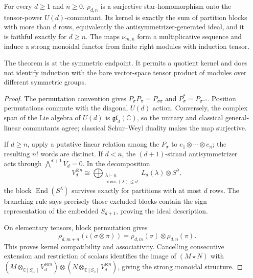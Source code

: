 \begin{theorem}
{\normalfont\statusProved}\quad For every $d\geq1$ and $n\geq0$,
$\rho_{d,n}$ is a surjective star-homomorphism onto the tensor-power
$U(d)$-commutant.  Its kernel is exactly the sum of partition blocks with
more than $d$ rows, equivalently the antisymmetrizer-generated ideal, and it
is faithful exactly for $d\geq n$.  The maps $\nu_{m,n}$ form a
multiplicative sequence and induce a strong monoidal functor from finite
right modules with induction tensor.
\end{theorem}
\begin{scope}
The theorem is at the symmetric endpoint.  It permits a quotient kernel and
does not identify induction with the bare vector-space tensor product of
modules over different symmetric groups.
\end{scope}
\begin{proof}
The permutation convention gives $P_\sigma P_\pi=P_{\sigma\pi}$ and
$P_\sigma^*=P_{\sigma^{-1}}$.  Position permutations commute with the
diagonal $U(d)$ action.  Conversely, the complex span of the Lie algebra of
$U(d)$ is $\mathfrak{gl}_d(\mathbb C)$, so the unitary and classical
general-linear commutants agree; classical Schur--Weyl duality makes the map
surjective.

If $d\geq n$, apply a putative linear relation among the $P_\sigma$ to
$e_1\otimes\cdots\otimes e_n$; the resulting $n!$ words are distinct.  If
$d<n$, the $(d+1)$-strand antisymmetrizer acts through
$\bigwedge^{d+1}V_d=0$.  In the decomposition
\[
 V_d^{\otimes n}\cong
 \bigoplus_{\substack{\lambda\vdash n\\\operatorname{rows}(\lambda)\leq d}}
 L_d(\lambda)\otimes S^\lambda,
\]
the block $\operatorname{End}(S^\lambda)$ survives exactly for partitions
with at most $d$ rows.  The branching rule says precisely those excluded
blocks contain the sign representation of the embedded $S_{d+1}$, proving
the ideal description.

On elementary tensors, block permutation gives
\[
 \rho_{d,m+n}(\iota(\sigma\otimes\pi))
 =\rho_{d,m}(\sigma)\otimes\rho_{d,n}(\pi).
\]
This proves kernel compatibility and associativity.  Cancelling consecutive
extension and restriction of scalars identifies the image of
$(M\star N)$ with
$(M\otimes_{\mathbb C[S_m]}V_d^{\otimes m})\otimes
 (N\otimes_{\mathbb C[S_n]}V_d^{\otimes n})$, giving the strong monoidal
structure.
\end{proof}

